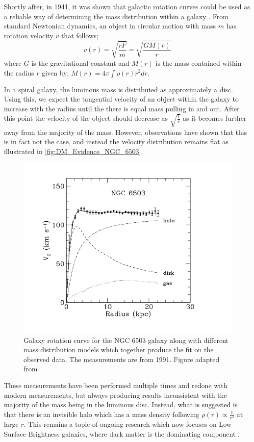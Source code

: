 \par
Shortly after, in 1941, it was shown that galactic rotation curves could be used as a reliable way of determining the mass distribution within a galaxy \cite{Chandrasekhar_1941_ref}.
From standard Newtonian dynamics, an object in circular motion with mass $m$ has rotation velocity $v$ that follows;
\begin{equation}
    v(r) = \sqrt{\frac{rF}{m}} = \sqrt{\frac{GM(r)}{r}}
    \label{eq:Kepler_Motion}
\end{equation}
where $G$ is the gravitational constant and $M(r)$ is the mass contained within the radius $r$ given by; $M(r) = 4 \pi \int \rho(r) r^{2} dr$.
\par
In a spiral galaxy, the luminous mass is distributed as approximately a disc. 
Using this, we expect the tangential velocity of an object within the galaxy to increase with the radius until the there is equal mass pulling in and out.
After this point the velocity of the object should decrease as $\sqrt{\frac{1}{r}}$ as it becomes further away from the majority of the mass.
However, observations have shown that this is in fact not the case, and instead the velocity distribution remains flat as illustrated in \autoref{fig:DM_Evidence_NGC_6503}.
\begin{figure}[!htbp]%
    \centering
    \includegraphics[scale=1.0]{Figures/DarkMatterEvidence/NGC_6503_galaxy_speed.png}
    \caption[Galaxy rotation curve for the NGC 6503 galaxy]{Galaxy rotation curve for the NGC 6503 galaxy along with different mass distribution models which together produce the fit on the observed data. The measurements are from 1991. Figure adapted from \cite{NGC_6503_galaxy_rotation_ref}}
    \label{fig:DM_Evidence_NGC_6503}
\end{figure}
These measurements have been performed multiple times and redone with modern measurements, but always producing results inconsistent with the majority of the mass being in the luminous disc.
Instead, what is suggested is that there is an invisible halo which has a mass density following $\rho(r) \propto \frac{1}{r^2}$ at large $r$.
This remains a topic of ongoing research which now focuses on Low Surface Brightness galaxies, where dark matter is the dominating component \cite{MHONGOOSE_2018_ref}.


